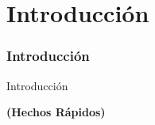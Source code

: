 %

\section{Introducción}
\begin{frame}[fragile]
	\frametitle{Introducción}

	\begin{center}\huge{Introducción}\end{center}
	\begin{center}\huge{\color{typo3darkgrey}\textbf{(Hechos Rápidos)}}\end{center}

\end{frame}


